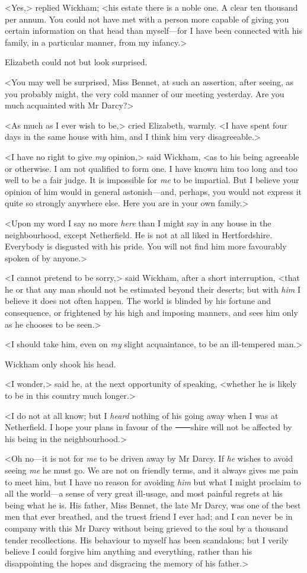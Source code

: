 <Yes,> replied Wickham; <his estate there is a noble one. A clear ten thousand per annum. You could not have met with a person more capable of giving you certain information on that head than myself—for I have been connected with his family, in a particular manner, from my infancy.>

Elizabeth could not but look surprised.

<You may well be surprised, Miss Bennet, at such an assertion, after seeing, as you probably might, the very cold manner of our meeting yesterday. Are you much acquainted with Mr Darcy?>

<As much as I ever wish to be,> cried Elizabeth, warmly. <I have spent four days in the same house with him, and I think him very disagreeable.>

<I have no right to give \textit{my} opinion,> said Wickham, <as to his being agreeable or otherwise. I am not qualified to form one. I have known him too long and too well to be a fair judge. It is impossible for \textit{me} to be impartial. But I believe your opinion of him would in general astonish—and, perhaps, you would not express it quite so strongly anywhere else. Here you are in your own family.>

<Upon my word I say no more \textit{here} than I might say in any house in the neighbourhood, except Netherfield. He is not at all liked in Hertfordshire. Everybody is disgusted with his pride. You will not find him more favourably spoken of by anyone.>

<I cannot pretend to be sorry,> said Wickham, after a short interruption, <that he or that any man should not be estimated beyond their deserts; but with \textit{him} I believe it does not often happen. The world is blinded by his fortune and consequence, or frightened by his high and imposing manners, and sees him only as he chooses to be seen.>

<I should take him, even on \textit{my} slight acquaintance, to be an ill-tempered man.>

Wickham only shook his head.

<I wonder,> said he, at the next opportunity of speaking, <whether he is likely to be in this country much longer.>

<I do not at all know; but I \textit{heard} nothing of his going away when I was at Netherfield. I hope your plans in favour of the ⸺shire will not be affected by his being in the neighbourhood.>

<Oh no—it is not for \textit{me} to be driven away by Mr Darcy. If \textit{he} wishes to avoid seeing \textit{me} he must go. We are not on friendly terms, and it always gives me pain to meet him, but I have no reason for avoiding \textit{him} but what I might proclaim to all the world—a sense of very great ill-usage, and most painful regrets at his being what he is. His father, Miss Bennet, the late Mr Darcy, was one of the best men that ever breathed, and the truest friend I ever had; and I can never be in company with this Mr Darcy without being grieved to the soul by a thousand tender recollections. His behaviour to myself has been scandalous; but I verily believe I could forgive him anything and everything, rather than his disappointing the hopes and disgracing the memory of his father.>

